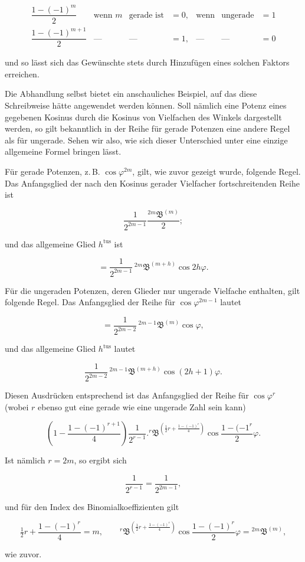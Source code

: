 \[
\begin{array}{rcccccc}
\dfrac{1-(-1)^m}{2}&\text{wenn }m&\text{gerade ist}&=0,&\text{wenn}&\text{ungerade}&=1\\[5pt]
\dfrac{1-(-1)^{m+1}}{2}&\text{—}&\text{—}&=1,&\text{—}&\text{—}&=0
\end{array}
\]

\noindent und so lässt sich das Gewünschte stets durch Hinzufügen eines solchen Faktors erreichen.

Die Abhandlung selbst bietet ein anschauliches Beispiel, auf das diese
Schreibweise hätte angewendet werden können. Soll nämlich eine Potenz eines
gegebenen Kosinus durch die Kosinus von Vielfachen des Winkels dargestellt
werden, so gilt bekanntlich in der Reihe für gerade Potenzen eine andere Regel
als für ungerade. Sehen wir also, wie sich dieser Unterschied unter eine einzige allgemeine Formel bringen lässt.

Für gerade Potenzen, z.\,B. $\cos\varphi^{2m}$, gilt, wie zuvor gezeigt wurde, folgende Regel.
Das Anfangsglied der nach den Kosinus gerader Vielfacher fortschreitenden Reihe
ist

\[
\frac{1}{2^{2m-1}}\frac{{}^{2m}\mathfrak{B}^{(m)}}{2};
\]

\noindent und das allgemeine Glied $h^{\text{tus}}$ ist

\[
= \frac{1}{2^{2m-1}}\,{}^{2m}\mathfrak{B}^{(m+h)}\cos2h\varphi.
\]

Für die ungeraden Potenzen, deren Glieder nur ungerade Vielfache enthalten,
gilt folgende Regel. Das Anfangsglied der Reihe für $\cos\varphi^{2m-1}$ lautet

\[
= \frac{1}{2^{2m-2}}\,{}^{2m-1}\mathfrak{B}^{(m)}\cos\varphi,
\]

\noindent und das allgemeine Glied $h^{\text{tus}}$ lautet

\[
\frac{1}{2^{2m-2}}\,{}^{2m-1}\mathfrak{B}^{(m+h)}\cos(2h+1)\varphi.
\]

Diesen Ausdrücken entsprechend ist das Anfangsglied der Reihe für
$\cos\varphi^r$ (wobei $r$ ebenso gut eine gerade wie eine ungerade Zahl sein kann)

\[
\left(1-\frac{1-(-1)^{r+1}}{4}\right)\frac{1}{2^{r-1}} . {}^{r}\mathfrak{B}^{\left(\frac{1}{2}r+\frac{1-(-1)^r}{4}\right)}\cos\frac{1-(-1^r}{2}\varphi.
\]

\noindent Ist nämlich $r=2m$, so ergibt sich

\[
\frac{1}{2^{r-1}} = \frac{1}{2^{2m-1}},
\]

\noindent und für den Index des Binomialkoeffizienten gilt

\[
\tfrac{1}{2}r+\frac{1-(-1)^r}{4} = m,\qquad {}^{r}\mathfrak{B}^{\left(\frac{1}{2}r+\frac{1-(-1)^r}{4}\right)}\cos\frac{1-(-1)^r}{2}\varphi = {}^{2m}\mathfrak{B}^{(m)},
\]

\noindent wie zuvor.

